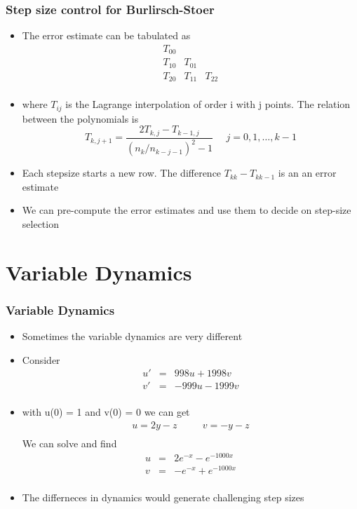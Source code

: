 \documentclass[10pt]{beamer}
\begin{document}
\begin{frame}
  \frametitle{Step size control for Burlirsch-Stoer}
  \begin{itemize}
  \item The error estimate can be tabulated as
    \[
      \begin{array}{lll}
        T_{00} && \\
        T_{10} & T_{01} & \\
        T_{20} & T_{11} & T_{22} \\
      \end{array}
    \]
  \item where $T_{ij}$ is the Lagrange interpolation of order i with j points. The relation between the polynomials is
    \[
      T_{k, j+1} = \frac{2 T_{k,j} - T_{k-1,j}}{(n_k / n_{k-j-1})^2 - 1} \mbox{~~~~} j = 0, 1, \ldots, k-1
    \]
  \item Each stepsize starts a new row. The difference
    $T_{kk} - T_{kk-1}$ is an an error estimate
  \item We can pre-compute the error estimates and use them to decide
    on step-size selection
  \end{itemize}
\end{frame}


\section{Variable Dynamics}

\begin{frame}
  \frametitle{Variable Dynamics}
  \begin{itemize}
  \item Sometimes the variable dynamics are very different
  \item Consider
    \[
      \begin{array}{rcl}
        u' & = & 998 u + 1998 v\\
        v' & = & -999u - 1999 v\\
      \end{array}
    \]
  \item with u(0) = 1 and v(0) = 0 we can get
    \[
      \begin{array}{rcl}
        u = 2 y - z & \mbox{~~~}& v = -y -z \\
      \end{array}
    \]
    We can solve and find
    \[
      \begin{array}{rcl}
        u & = & 2 e^{-x} - e^{-1000x}\\
        v & = & - e^{-x} + e^{-1000x}\\
      \end{array}
    \]
  \item The differneces in dynamics would generate challenging step sizes
  \end{itemize}
\end{frame}
\end{document}
